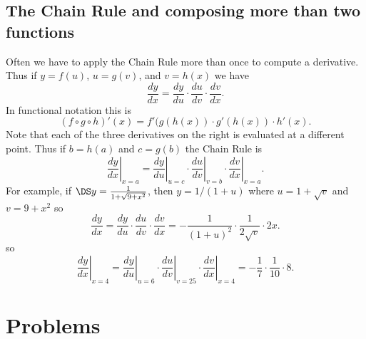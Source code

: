 \subsection{The Chain Rule and composing more than two functions}
Often we have to apply the Chain Rule more than once to compute a
derivative. Thus if $y=f(u)$, $u=g(v)$, and $v=h(x)$ we have
\[
\frac{dy}{dx}=\frac{dy}{du}\cdot \frac{du}{dv}\cdot \frac{dv}{dx}.
\]
In functional notation this is
\[
(f \circ g\circ h)'(x)=f'(g(h(x))\cdot g'(h(x))\cdot h'(x).
\]
Note that each of the three derivatives on the right is evaluated
at a different point.  Thus if $b=h(a)$ and $c=g(b)$ the Chain
Rule is
\[
\left.\frac{dy}{dx}\right|_{x=a}=
\left.\frac{dy}{du}\right|_{u=c}\cdot
\left.\frac{du}{dv}\right|_{v=b}\cdot
\left.\frac{dv}{dx}\right|_{x=a}.
\]
For example, if $\DS y=\frac1{1+\sqrt{9+x^2}}$, then $y=1/(1+u)$
where $u=1+\sqrt{v}$ and $v=9+x^2$ so
\[
\frac{dy}{dx}=\frac{dy}{du}\cdot \frac{du}{dv}\cdot \frac{dv}{dx}
=-\frac1{(1+u)^2}\cdot\frac1{2\sqrt{v}}\cdot 2x.
\]
so
\[
\left.\frac{dy}{dx}\right|_{x=4}=
\left.\frac{dy}{du}\right|_{u=6}\cdot
\left.\frac{du}{dv}\right|_{v=25}\cdot
\left.\frac{dv}{dx}\right|_{x=4} = - \frac17\cdot\frac1{10}\cdot
8.
\]




\section{Problems}
\problemfont

